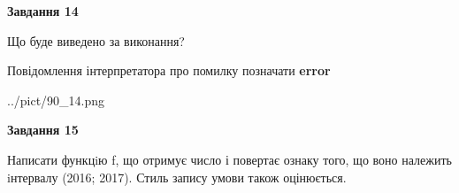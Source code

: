 \documentclass[11pt, ukrainian]{article}
\begin{document}
{\begin {large}
{\begin {center}\textbf{Завдання 14}\end {center}}\par
Що буде виведено за виконання? \par
Повідомлення інтерпретатора про помилку позначати \textbf{error}

\begin{center}
	{../pict/90_14.png}
\end{center}
\newpage

{\begin {center}\textbf{Завдання 15}\end {center}}\par

Написати функцiю f, що отримує число і повертає ознаку того, що воно належить iнтервалу (2016; 2017). Стиль запису умови також оцінюється.\par
\newpage

\end {large}}
\end{document}
